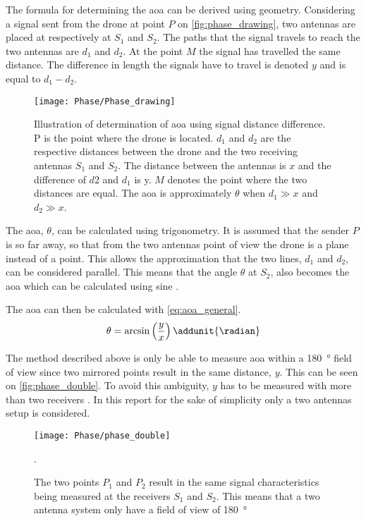 The formula for determining the \gls{aoa} can be derived using geometry.
Considering a signal sent from the drone at point $P$ on \autoref{fig:phase_drawing}, two antennas are placed at respectively at $S_1$ and $S_2$. The paths that the signal travels to reach the two antennas are $d_1$ and $d_2$. At the point $M$ the signal has travelled the same distance.
The difference in length the signals have to travel is denoted $y$ and is equal to $d_1-d_2$. 
\begin{figure}[h]
\centering
\texttt{[image: Phase/Phase\_drawing]}
\caption{Illustration of determination of \gls{aoa} using signal distance difference. P is the point where the drone is located. $d_1$ and $d_2$ are the respective distances between the drone and the two receiving antennas $S_1$ and $S_2$. The distance between the antennas is $x$ and the difference of $d2$ and $d_1$ is y. $M$ denotes the point where the two distances are equal. The \gls{aoa} is approximately $\theta$ when $d_1 \gg x$ and $d_2 \gg x$.}
\label{fig:phase_drawing}
\end{figure}

The \gls{aoa}, $\theta$, can be calculated using trigonometry. It is assumed that the sender $P$ is so far away, so that from the two antennas point of view the drone is a plane instead of a point. This allows the approximation that the two lines, $d_1$ and $d_2$, can be considered parallel.
This means that the angle $\theta$ at $S_2$, also becomes the \gls{aoa} which can be calculated using sine \citep{TechReport:DirectionFindingPaper}.

The \gls{aoa} can then be calculated with \autoref{eq:aoa_general}. 
\begin{equation} \label{eq:aoa_general}
	\theta = \arcsin\left(\frac{y}{x}\right) \addunit{\radian}
\end{equation}
\startexplain
{}
\stopexplain

The method described above is only be able to measure \gls{aoa} within a \SI{180}{\degree} field of view since two mirrored points result in the same distance, $y$. 
This can be seen on \autoref{fig:phase_double}. To avoid this ambiguity, $y$ has to be measured with more than two receivers \citep{TechReport:Amundson2010}. In this report for the sake of simplicity only a two antennas setup is considered.
\begin{figure}[h]
\centering
\texttt{[image: Phase/phase\_double]}
\caption{The two points $P_1$ and $P_2$ result in the same signal characteristics being measured at the receivers $S_1$ and $S_2$. This means that a two antenna system only have a field of view of \SI{180}{\degree}}.
\label{fig:phase_double}
\end{figure}

